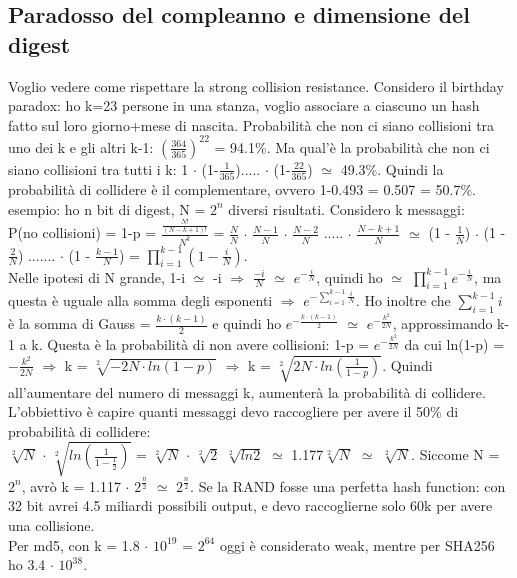 \documentclass[16px]{article}
\begin{document}
\begin{enumerate}
\subsection{Paradosso del compleanno e dimensione del digest}
Voglio vedere come rispettare la strong collision resistance. Considero il birthday paradox: ho k=23 persone in una stanza, voglio associare a ciascuno un hash fatto sul loro giorno+mese di nascita. Probabilità che non ci siano collisioni tra uno dei k e gli altri k-1: $(\frac{364}{365})^{22}$ = 94.1\%. Ma qual'è la probabilità che non ci siano collisioni tra tutti i k: 1 $\cdot$ (1-$\frac{1}{365}$)..... $\cdot$ (1-$\frac{22}{365}$) $\simeq$ 49.3\%. Quindi la probabilità di collidere è il complementare, ovvero 1-0.493 = 0.507 = 50.7\%. esempio: ho n bit di digest, N = $2^n$ diversi risultati. Considero k messaggi:\\ P(no collisioni) = 1-p = $\frac{\frac{N!}{(N-k+1)!}}{N^k}$ = $\frac{N}{N}$ $\cdot$ $\frac{N-1}{N}$ $\cdot$ $\frac{N-2}{N}$ ..... $\cdot$ $\frac{N-k+1}{N}$ $\simeq$ (1 - $\frac{1}{N}$) $\cdot$ (1 - $\frac{2}{N}$) ....... $\cdot$ (1 - $\frac{k-1}{N}$) = $\prod\limits_{i=1}^{k-1}(1 - \frac{i}{N})$.\\ Nelle ipotesi di N grande, 1-i $\simeq$ -i $\Rightarrow$ $\frac{-i}{N}$ $\simeq$ $e^{-\frac{i}{N}}$, quindi ho $\simeq$ $\prod\limits_{i=1}^{k-1}e^{-\frac{i}{N}}$, ma questa è uguale alla somma degli esponenti $\Rightarrow$ $e^{-\sum\limits_{i=1}^{k-1}\frac{i}{N}}$. Ho inoltre che $\sum\limits_{i=1}^{k-1} i$ è la somma di Gauss = $\frac{k \cdot (k-1)}{2}$ e quindi ho $e^{-\frac{k \cdot (k-1)}{2}}$ $\simeq$ $e^{-\frac{k^2}{2N}}$, approssimando k-1 a k. Questa è la probabilità di non avere collisioni: 1-p = $e^{-\frac{k^2}{2N}}$ da cui ln(1-p) = $-\frac{k^2}{2N}$ $\Rightarrow$ k = $\sqrt[2]{-2N \cdot ln(1-p)}$ $\Rightarrow$ k = $\sqrt[2]{2N \cdot ln(\frac{1}{1-p})}$. Quindi all'aumentare del numero di messaggi k, aumenterà la probabilità di collidere. L'obbiettivo è capire quanti messaggi devo raccogliere per avere il 50\% di probabilità di collidere:\\
$\sqrt[2]{N}$ $\cdot$ $\sqrt[2]{ln(\frac{1}{1-\frac{1}{2}})}$ = $\sqrt[2]{N}$ $\cdot$ $\sqrt[2]{2}$ $\sqrt[2]{ln2}$ $\simeq$ 1.177$\sqrt[2]{N}$ $\simeq$ $\sqrt[2]{N}$. Siccome N = $2^n$, avrò k = 1.117 $\cdot$ $2^{\frac{n}{2}}$ $\simeq$ $2^{\frac{n}{2}}$. Se la RAND fosse una perfetta hash function: con 32 bit avrei 4.5 miliardi possibili output, e devo raccoglierne solo 60k per avere una collisione.\\ Per md5, con k = 1.8 $\cdot$ $10^{19}$ = $2^{64}$ oggi è considerato weak, mentre per SHA256 ho 3.4 $\cdot$ $10^{38}$.
\end{enumerate}
\end{document}

